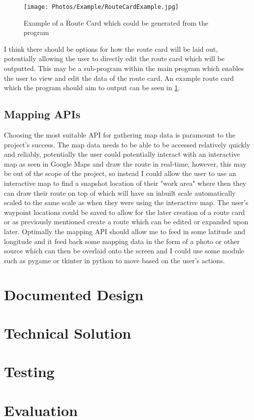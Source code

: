 \documentclass{article}
\begin{document}
        \begin{figure}[h]
            \centering
            \texttt{[image: Photos/Example/RouteCardExample.jpg]}
            \caption{Example of a Route Card which could be generated from the program}
            \label{fig:example_route_card}
         \end{figure}
         
         I think there should be options for how the route card will be laid out, potentially allowing the user to directly edit the route card which will be outputted. This may be a sub-program within the main program which enables the user to view and edit the data of the route card. An example route card which the program should aim to output can be seen in \cref{fig:example_route_card}.

    \subsection{Mapping APIs}

        Choosing the most suitable API for gathering map data is paramount to the project's success. The map data needs to be able to be accessed relatively quickly and reliably, potentially the user could potentially interact with an interactive map as seen in Google Maps and draw the route in real-time, however, this may be out of the scope of the project, so instead I could allow the user to use an interactive map to find a snapshot location of their "work area" where then they can draw their route on top of which will have an inbuilt scale automatically scaled to the same scale as when they were using the interactive map. The user's waypoint locations could be saved to allow for the later creation of a route card or as previously mentioned create a route which can be edited or expanded upon later. Optimally the mapping API should allow me to feed in some latitude and longitude and it feed back some mapping data in the form of a photo or other source which can then be overlaid onto the screen and I could use some module such as pygame or tkinter in python to move based on the user's actions.
    
\newpage

\section{Documented Design}

    

\newpage
    
\section{Technical Solution}

    

\newpage

\section{Testing}

    

\newpage

\section{Evaluation}

    
    
\end{document}
